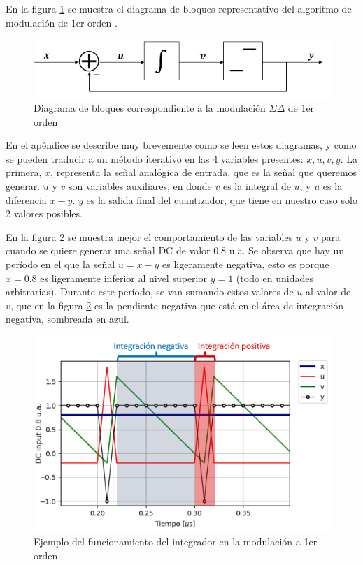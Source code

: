 \documentclass[twoside]{article}
\begin{document}
\begin{multicols}{2}
En la figura \ref{fig:bloques} se muestra el diagrama de bloques representativo del algoritmo de modulación de 1er orden \cite{script}.

\begin{figure}[H]
\centering
\includegraphics[width=\linewidth]{figuras/bloques_1erorden.png}
\caption{Diagrama de bloques correspondiente a la modulación $\Sigma\Delta$ de 1er orden}
\label{fig:bloques}
\end{figure}

En el apéndice se describe muy brevemente como se leen estos diagramas, y como se pueden traducir a un método iterativo en las 4 variables presentes: $x,u,v,y$.
La primera, $x$, representa la señal analógica de entrada, que es la señal que queremos generar. $u$ y $v$ son variables auxiliares, en donde $v$ es la integral de $u$, y $u$ es la diferencia $x-y$. $y$ es la salida final del cuantizador, que tiene en nuestro caso solo 2 valores posibles.



En la figura \ref{fig:integrador} se muestra mejor el comportamiento de las variables $u$ y $v$ para cuando se quiere generar una señal DC de valor 0.8 u.a. Se observa que hay un período en el que la señal $u=x-y$ es ligeramente negativa, esto es porque $x=0.8$ es ligeramente inferior al nivel superior $y=1$ (todo en unidades arbitrarias). Durante este período, se van sumando estos valores de $u$ al valor de $v$, que en la figura \ref{fig:integrador} es la pendiente negativa que está en el área de integración negativa, sombreada en azul.


\begin{figure}[H]
\centering
\includegraphics[width=\linewidth]{figuras/integracion.png}
\caption{Ejemplo del funcionamiento del integrador en la modulación a 1er orden}
\label{fig:integrador}
\end{figure}


\end{multicols}
\end{document}
